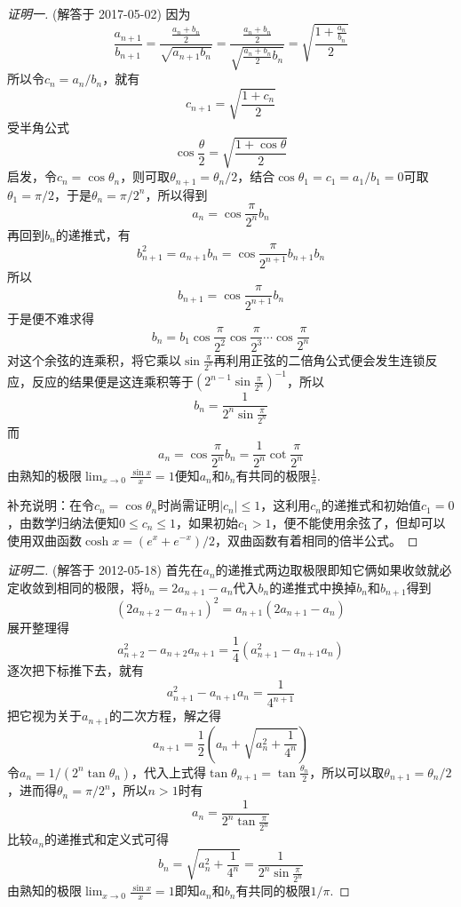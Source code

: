 \exerciseFrom[\url{http://kuing.orzweb.net/viewthread.php?tid=4569}]

\begin{proof}[证明一]
  (解答于 2017-05-02)
  因为
\[ \frac{a_{n+1}}{b_{n+1}}=\frac{\frac{a_n+b_n}{2}}{\sqrt{a_{n+1}b_n}} = \frac{\frac{a_n+b_n}{2}}{\sqrt{\frac{a_n+b_n}{2}b_n}} = \sqrt{\frac{1+\frac{a_n}{b_n}}{2}} \]
所以令$c_n=a_n / b_n$，就有
\[ c_{n+1}=\sqrt{\frac{1+c_n}{2}} \]
受半角公式
\[ \cos{\frac{\theta}{2}}=\sqrt{\frac{1+\cos{\theta}}{2}} \]
启发，令$c_n=\cos{\theta_n}$，则可取$\theta_{n+1}=\theta_n / 2$，结合$\cos{\theta_1}=c_1=a_1 / b_1=0$可取$\theta_1=\pi / 2$，于是$\theta_n=\pi / 2^n$，所以得到
\[ a_n=\cos\frac{\pi}{2^n}b_n \]
再回到$b_n$的递推式，有
\[ b_{n+1}^2=a_{n+1}b_n=\cos{\frac{\pi}{2^{n+1}}} b_{n+1}b_n\]
所以
\[ b_{n+1}=\cos{\frac{\pi}{2^{n+1}}} b_n \]
于是便不难求得
\[ b_n=b_1 \cos{\frac{\pi}{2^2}}\cos{\frac{\pi}{2^3}}\cdots \cos{\frac{\pi}{2^n}} \]
对这个余弦的连乘积，将它乘以$\sin{\frac{\pi}{2^n}}$再利用正弦的二倍角公式便会发生连锁反应，反应的结果便是这连乘积等于$\left( 2^{n-1}\sin{\frac{\pi}{2^n}} \right)^{-1}$，所以
\[ b_n=\frac{1}{2^n \sin{\frac{\pi}{2^n}}} \]
而
\[ a_n=\cos{\frac{\pi}{2^n}}b_n=\frac{1}{2^n}\cot{\frac{\pi}{2^n}} \]
由熟知的极限$\lim_{x \to 0} \frac{\sin{x}}{x}=1$便知$a_n$和$b_n$有共同的极限$\frac{1}{\pi}$.

补充说明：在令$c_n=\cos{\theta_n}$时尚需证明$|c_n| \leqslant 1$，这利用$c_n$的递推式和初始值$c_1=0$，由数学归纳法便知$0 \leqslant c_n \leqslant 1$，如果初始$c_1>1$，便不能使用余弦了，但却可以使用双曲函数$\cosh{x}=(e^x+e^{-x})/2$，双曲函数有着相同的倍半公式。
\end{proof}

\begin{proof}[证明二]
  (解答于 2012-05-18)
  首先在$a_n$的递推式两边取极限即知它俩如果收敛就必定收敛到相同的极限，将$b_n=2a_{n+1}-a_n$代入$b_n$的递推式中换掉$b_n$和$b_{n+1}$得到
  \[ (2a_{n+2}-a_{n+1})^{2} = a_{n+1}(2a_{n+1}-a_n) \]
  展开整理得
  \[ a_{n+2}^2-a_{n+2}a_{n+1} = \frac{1}{4}(a_{n+1}^2-a_{n+1}a_n) \]
  逐次把下标推下去，就有
  \[ a_{n+1}^2-a_{n+1}a_n = \frac{1}{4^{n+1}} \]
  把它视为关于$a_{n+1}$的二次方程，解之得
  \[ a_{n+1} = \frac{1}{2} \left( a_n+\sqrt{a_n^2+\frac{1}{4^n}} \right) \]
令$a_n=1/(2^n \tan{\theta_n})$，代入上式得$\tan{\theta_{n+1}}=\tan{\frac{\theta_n}{2}}$，所以可以取$\theta_{n+1}=\theta_n/2$，进而得$\theta_n=\pi / 2^n$，所以$n>1$时有
\[ a_n = \frac{1}{2^n \tan{\frac{\pi}{2^n}}} \]
比较$a_n$的递推式和定义式可得
\[ b_n = \sqrt{a_n^2+\frac{1}{4^n}} = \frac{1}{2^n \sin{\frac{\pi}{2^n}}} \]
由熟知的极限$\lim_{x \rightarrow 0} \frac{\sin{x}}{x}=1$即知$a_n$和$b_n$有共同的极限$1/\pi$.
\end{proof}

